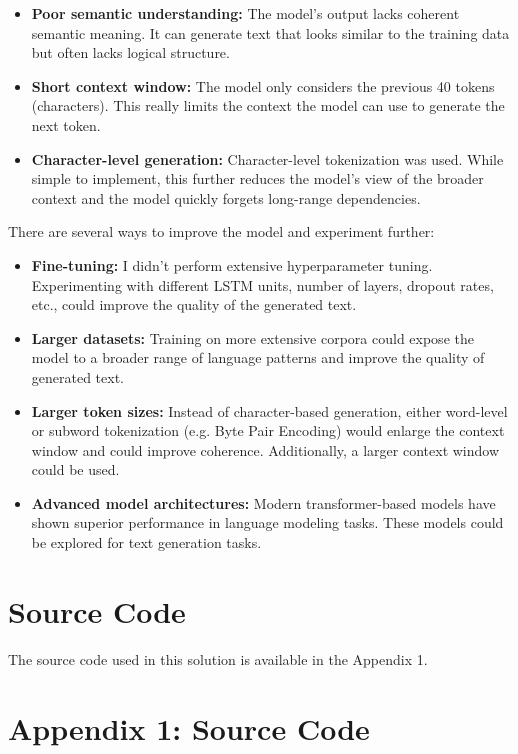 \documentclass{article}
\begin{document}
\begin{itemize}
    \item \textbf{Poor semantic understanding:} The model's output lacks coherent semantic meaning. It can generate text that looks similar to the training data but often lacks logical structure.
    \item \textbf{Short context window:} The model only considers the previous 40 tokens (characters). This really limits the context the model can use to generate the next token.
    \item \textbf{Character-level generation:} Character-level tokenization was used. While simple to implement, this further reduces the model's view of the broader context and the model quickly forgets long-range dependencies.
\end{itemize}

There are several ways to improve the model and experiment further:

\begin{itemize}
    \item \textbf{Fine-tuning:} I didn't perform extensive hyperparameter tuning. Experimenting with different LSTM units, number of layers, dropout rates, etc., could improve the quality of the generated text.
    \item \textbf{Larger datasets:} Training on more extensive corpora could expose the model to a broader range of language patterns and improve the quality of generated text.
    \item \textbf{Larger token sizes:} Instead of character-based generation, either word-level or subword tokenization (e.g. Byte Pair Encoding) would enlarge the context window and could improve coherence. Additionally, a larger context window could be used.
    \item \textbf{Advanced model architectures:} Modern transformer-based models have shown superior performance in language modeling tasks. These models could be explored for text generation tasks.
\end{itemize}

\section{Source Code}

The source code used in this solution is available in the Appendix 1.

\newpage

\section{Appendix 1: Source Code}
\end{document}
